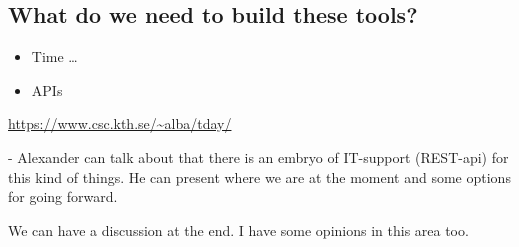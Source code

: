 \subsection{What do we need to build these tools?}

\begin{frame}[fragile]
  \begin{example}
    \begin{itemize}
      \item Time \dots
      \item \alert<2>{APIs}
    \end{itemize}
  \end{example}
\end{frame}

\begin{frame}[fragile]
  \begin{center}
    \url{https://www.csc.kth.se/~alba/tday/}
  \end{center}
\end{frame}

- Alexander can talk about that there is an embryo of IT-support
(REST-api) for this kind of things. He can present where we are at the
moment and some options for going forward.

We can have a discussion at the end. I have some opinions in this area
too.

